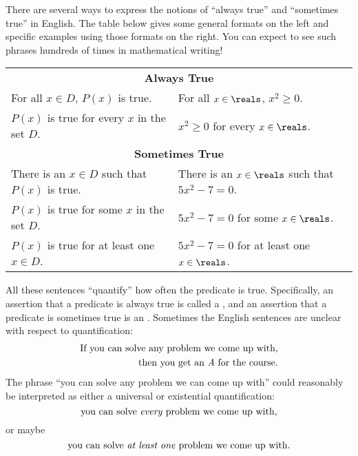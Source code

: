 There are several ways to express the notions of ``always true'' and
``sometimes true'' in English.  The table below gives some general
formats on the left and specific examples using those formats on the
right.  You can expect to see such phrases hundreds of times in
mathematical writing!
\begin{center}
\begin{tabular}{ll}
\multicolumn{2}{c}{\textbf{Always True}} \\[1ex]
For all $x \in D$, $P(x)$ is true. & For all $x \in \reals$, $x^2 \geq 0$. \\
$P(x)$ is true for every $x$ in the set $D$. & $x^2 \geq 0$ for every $x \in \reals$. \\[2ex]
\multicolumn{2}{c}{\textbf{Sometimes True}} \\[1ex]
There is an $x \in D$ such that $P(x)$ is true. & There is an $x \in \reals$ such that $5x^2 - 7 = 0$.\\
$P(x)$ is true for some $x$ in the set $D$. & $5x^2 - 7 = 0$ for some $x \in \reals$.\\
$P(x)$ is true for at least one $x \in D$. & $5x^2-7=0$ for at least one $x \in \reals$.
\end{tabular}
\end{center}

All these sentences ``quantify'' how often the predicate is true.
Specifically, an assertion that a predicate is always true is called a
, and an assertion that a predicate is
sometimes true is an .  Sometimes the
English sentences are unclear with respect to quantification:
\begin{align}
  \text{If you can solve any problem we come up with,}\notag\\
  \text{then you get an \emph{A} for the course.}\label{solvegetA}
\end{align}
The phrase ``you can solve any problem we can come up with'' could
reasonably be interpreted as either a universal or existential
quantification:
\begin{equation}\label{solve_every}
\text{you can solve \emph{every} problem we come up with,}
\end{equation}
or maybe
\begin{equation}\label{solve_atleastone}
\text{you can solve \emph{at least one} problem we come up with.}
\end{equation}


